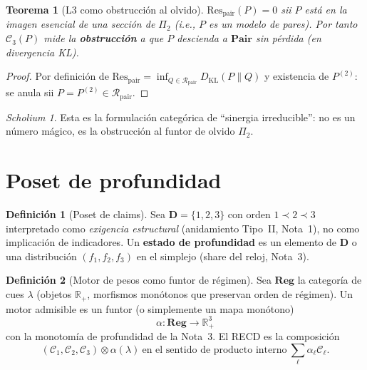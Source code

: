 \documentclass[11pt,a4paper]{article}
\theoremstyle{definition}
\newtheorem{definition}{Definici\'on}[section]
\theoremstyle{plain}
\newtheorem{theorem}{Teorema}[section]
\theoremstyle{remark}
\newtheorem{scholium}{Scholium}[section]
\newcommand{\Res}{\mathrm{Res}}
\newcommand{\Rpair}{\mathcal{R}_{\mathrm{pair}}}
\newcommand{\KL}{D_{\mathrm{KL}}}
\begin{document}
\begin{theorem}[L3 como obstrucci\'on al olvido]
\label{thm:obstruction}
$\Res_{\mathrm{pair}}(P)=0$ sii $P$ est\'a en la imagen esencial de una
secci\'on de $\Pi_2$ (i.e., $P$ es un modelo de pares). Por tanto
$\mathcal{C}_3(P)$ mide la \textbf{obstrucci\'on} a que $P$ descienda a
$\mathbf{Pair}$ sin p\'erdida (en divergencia KL).
\end{theorem}

\begin{proof}
Por definici\'on de $\Res_{\mathrm{pair}}=\inf_{Q\in\Rpair}\KL(P\|Q)$ y
existencia de $P^{(2)}$: se anula sii $P=P^{(2)}\in\Rpair$.
\end{proof}

\begin{scholium}
Esta es la formulaci\'on categ\'orica de ``sinergia irreducible'': no es
un n\'umero m\'agico, es la obstrucci\'on al funtor de olvido $\Pi_2$.
\end{scholium}

\section{Poset de profundidad}
\label{sec:poset}

\begin{definition}[Poset de claims]
\label{def:poset}
Sea $\mathbf{D}=\{1,2,3\}$ con orden $1\prec 2\prec 3$ interpretado como
\emph{exigencia estructural} (anidamiento Tipo~II, Nota~1), no como
implicaci\'on de indicadores.
Un \textbf{estado de profundidad} es un elemento de $\mathbf{D}$ o una
distribuci\'on $(f_1,f_2,f_3)$ en el simplejo (share del reloj, Nota~3).
\end{definition}

\begin{definition}[Motor de pesos como funtor de r\'egimen]
\label{def:weight_fun}
Sea $\mathbf{Reg}$ la categor\'ia de cues $\lambda$ (objetos
$\mathbb{R}_+$, morfismos mon\'otonos que preservan orden de r\'egimen).
Un motor admisible es un funtor (o simplemente un mapa mon\'otono)
\begin{equation}
\alpha:\mathbf{Reg}\to\mathbb{R}_{+}^{3}
\end{equation}
con la monotom\'ia de profundidad de la Nota~3. El RECD es la
composici\'on
\begin{equation}
(\mathcal{C}_1,\mathcal{C}_2,\mathcal{C}_3)\otimes\alpha(\lambda)
\ \text{en el sentido de producto interno}\ 
\sum_\ell\alpha_\ell\mathcal{C}_\ell.
\end{equation}
\end{definition}
\end{document}
